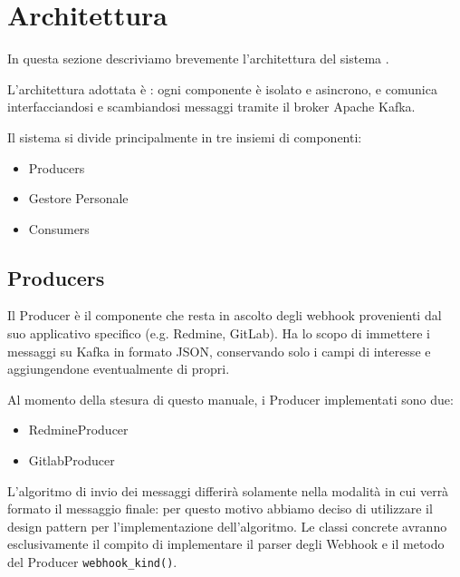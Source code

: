 \section{Architettura}

In questa sezione descriviamo brevemente l'architettura del sistema \progetto.

L'architettura adottata è : ogni componente è isolato e asincrono,
e comunica interfacciandosi e scambiandosi messaggi tramite il broker Apache Kafka.

Il sistema si divide principalmente in tre insiemi di componenti:

\begin{itemize}
    \item Producers
    \item Gestore Personale
    \item Consumers
\end{itemize}

\subsection{Producers}
Il Producer è il componente che resta in ascolto degli webhook provenienti dal suo applicativo specifico (e.g. Redmine, GitLab).
Ha lo scopo di immettere i messaggi su Kafka in formato JSON, conservando solo i campi di interesse e aggiungendone eventualmente di propri.

Al momento della stesura di questo manuale, i Producer implementati sono due:
\begin{itemize}
    \item RedmineProducer
    \item GitlabProducer
\end{itemize}

L'algoritmo di invio dei messaggi differirà solamente nella modalità in cui verrà formato il messaggio finale: per questo motivo abbiamo deciso di utilizzare
il design pattern  per l'implementazione dell'algoritmo. Le classi concrete avranno esclusivamente il compito di implementare
il parser degli Webhook e il metodo del Producer \texttt{webhook\_kind()}.




